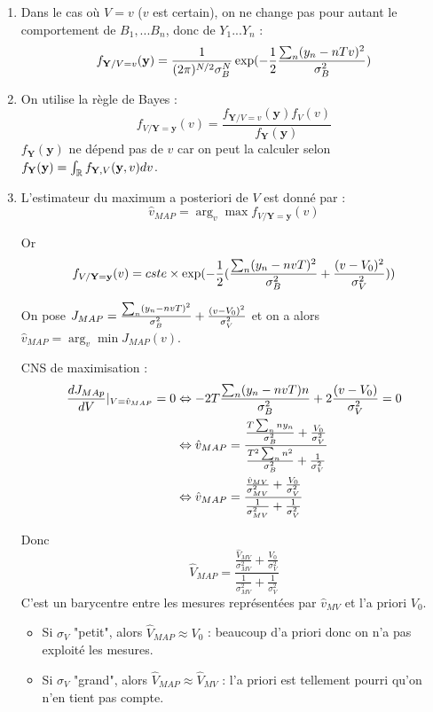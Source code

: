 \documentclass[main.tex]{subfiles}
\begin{document}
\begin{enumerate}\setlength{\itemsep}{10mm}
\item Dans le cas où $V=v$ ($v$ est certain), on ne change pas pour autant le comportement de $B_1,...B_n$, donc de $Y_1...Y_n$ :
\[ f_{\mathbf{Y}/V=v}(\mathbf{y}) = \frac{1}{(2\pi)^{N/2}\sigma_B^N}\exp(-\frac{1}{2}\frac{\sum_n(y_n-nTv)^2}{\sigma_B^2}) \]

\item On utilise la règle de Bayes :
\[f_{V/\mathbf{Y}=\mathbf{y}}(v)  = \frac{f_{\mathbf{Y}/V=v}(\mathbf{y}) f_V(v)}{f_{\mathbf{Y}}(\mathbf{y})} \]
$f_{\mathbf{Y}}(\mathbf{y})$ ne dépend pas de $v$ car on peut la calculer selon $f_{\mathbf{Y}}(\mathbf{y}) = \int_{\mathbb{R}} f_{\mathbf{Y},V}(\mathbf{y},v)dv$.

\item L'estimateur du maximum a posteriori de $V$ est donné par :
\[\hat{v	}_{MAP} = \arg_v \max f_{V/\mathbf{Y}=\mathbf{y}}(v)\]

Or \[ f_{V/\mathbf{Y}=\mathbf{y}}(v) = cste \times \exp(-\frac{1}{2}(\frac{\sum_n (y_n - nvT)^2}{\sigma_B^2} + \frac{(v-V_0)^2}{\sigma_V^2})) \]

On pose $J_{MAP} = \frac{\sum_n (y_n - nvT)^2}{\sigma_B^2} + \frac{(v-V_0)^2}{\sigma_V^2}$ et on a alors $\hat{v}_{MAP} = \arg_v \min J_{MAP}(v)$.

CNS de maximisation : 
\begin{align*}
\frac{dJ_{MAp}}{dV}|_{V =\hat{v}_{MAP}} = 0  & \Leftrightarrow -2T \frac{\sum_n (y_n - nvT)n}{\sigma_B^2} + 2\frac{(v-V_0)}{\sigma_V^2} = 0 \\
& \Leftrightarrow \hat{v}_{MAP} = \frac{\frac{T\sum_n ny_n}{\sigma_B^2}+\frac{V_0}{\sigma_V^2}}{\frac{T^2 \sum_n n^2}{\sigma_B^2} + \frac{1}{\sigma_V^2}} \\
& \Leftrightarrow \hat{v}_{MAP} = \frac{\frac{\hat{v}_{MV}}{\sigma_{MV}^2} + \frac{V_0}{\sigma_V^2}}{\frac{1}{\sigma_{MV}^2} + \frac{1}{\sigma_V^2}}
\end{align*}

Donc 
\[ \hat{V}_{MAP} = \frac{\frac{\hat{V}_{MV}}{\sigma_{MV}^2} + \frac{V_0}{\sigma_V^2}}{\frac{1}{\sigma_{MV}^2} + \frac{1}{\sigma_V^2}} \]
C'est un barycentre entre les mesures représentées par $\hat{v}_{MV}$ et l'a priori $V_0$.

\begin{itemize}
\item Si $\sigma_V$ "petit", alors $\hat{V}_{MAP} \approx V_0$ : beaucoup d'a priori donc on n'a pas exploité les mesures.
\item Si $\sigma_V$ "grand", alors $\hat{V}_{MAP} \approx \hat{V}_{MV}$ : l'a priori est tellement pourri qu'on n'en tient pas compte.
\end{itemize}


\end{enumerate}
\end{document}
